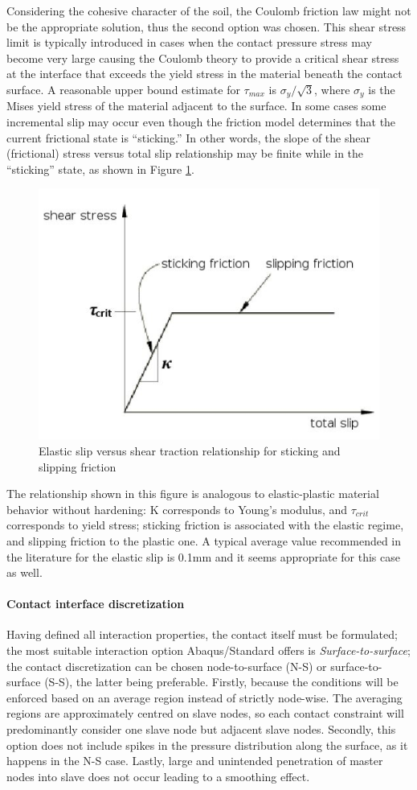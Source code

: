 Considering the cohesive character of the soil, the Coulomb friction law might not be the appropriate solution, thus the second option was chosen. This shear stress limit is typically introduced in cases when the contact pressure stress may become very large causing the Coulomb theory to provide a critical shear stress at the interface that exceeds the yield stress in the material beneath the contact surface. A reasonable upper bound estimate for $\tau_{max}$ is $\sigma_y/\sqrt{3}$, where $\sigma_y$ is the Mises yield stress of the material adjacent to the surface. In some cases some incremental slip may occur even though the friction model determines that the current frictional state is “sticking.” In other words, the slope of the shear (frictional) stress versus total slip relationship may be finite while in the “sticking” state, as shown in Figure \ref{stick}.

\begin{figure}[!h]
	\centering
	\includegraphics[width=0.5\linewidth]{"stick"}
	\caption{Elastic slip versus shear traction relationship for sticking and slipping friction}
	\label{stick}
\end{figure} 

The relationship shown in this figure is analogous to elastic-plastic material behavior without hardening: K corresponds to Young's modulus, and $\tau_{crit}$ corresponds to yield stress; sticking friction is associated with the elastic regime, and slipping friction to the plastic one. A typical average value recommended in the literature for the elastic slip is 0.1mm and it seems appropriate for this case as well.

\paragraph{Contact interface discretization}
Having defined all interaction properties, the contact itself must be formulated; the most suitable interaction option Abaqus/Standard offers is \textit{Surface-to-surface}; the contact discretization can be chosen node-to-surface (N-S) or surface-to-surface (S-S), the latter being preferable. Firstly, because the conditions will be enforced based on an average region instead of strictly node-wise. The averaging regions are approximately centred on slave nodes, so each contact constraint will predominantly consider one slave node but adjacent slave nodes. Secondly, this option does not include spikes in the pressure distribution along the surface, as it happens in the N-S case. Lastly, large and unintended penetration of master nodes into slave does not occur leading to a smoothing effect.

